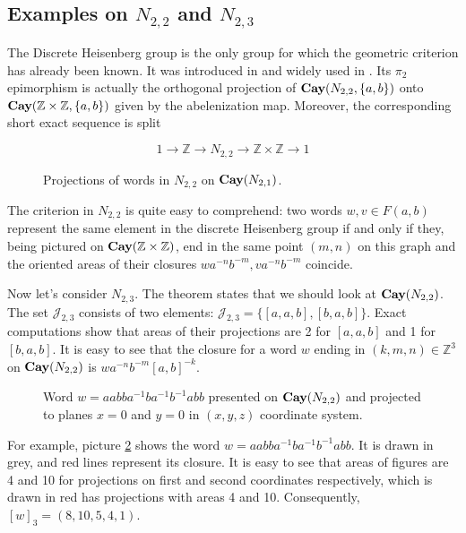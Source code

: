\documentclass[11pt]{amsart}
\theoremstyle{plain}
\theoremstyle{definition}
\numberwithin{equation}{section}
\newcommand{\Cay}{\text{\bf Cay}}
\newcommand{\ZZ}{\mathbb{Z}}
\begin{document}
\subsection{Examples on $N_{2,2}$ and $N_{2,3}$}
The Discrete Heisenberg group is the only group for which the geometric criterion has already been known. It was introduced in \cite{Shapiro} and widely used in \cite{Ruslan, Shapiro, InfiniteG, Rational growth}. Its $\pi_2$ epimorphism is actually the orthogonal projection of $\Cay(N_{2,2},\{a,b\})$ onto $\Cay(\ZZ\times\ZZ,\{a,b\})$ given by the abelenization map. Moreover, the corresponding short exact sequence is split

$$1\longrightarrow \ZZ \longrightarrow N_{2,2}\longrightarrow \ZZ\times\ZZ\longrightarrow1$$



   \begin{figure}[h]
\caption{Projections of words in $N_{2,2}$ on  $\Cay(N_{2,1})$.}
\label{Geodesics}
\end{figure}

The criterion in $N_{2,2}$ is quite easy to comprehend: two words $w,v\in F(a,b)$ represent the same element in the discrete Heisenberg group if and only if they, being pictured on $\Cay(\ZZ\times\ZZ)$, end in the same point $(m,n)$ on this graph and the oriented areas of their closures $wa^{-n}b^{-m}, va^{-n}b^{-m}$ coincide.


Now let's consider $N_{2,3}$. The theorem states that we should look at $\Cay(N_{2,2})$. The set $\mathcal{J}_{2,3}$ consists of two elements: $\mathcal{J}_{2,3} = \{[a,a,b], [b,a,b]\}$. Exact computations show that areas of their projections are 2 for $[a,a,b]$ and 1 for $[b,a,b]$. It is easy to see that the closure for a word $w$ ending in $(k,m,n) \in \ZZ^3$ on $\Cay(N_{2,2})$ is $wa^{-n}b^{-m}[a,b]^{-k}$. 


 \begin{figure}[h]
\caption{Word $w = aabba^{-1}ba^{-1}b^{-1}abb$ presented on $\Cay(N_{2,2})$ and projected to planes $x=0$ and $y=0$ in $(x,y,z)$ coordinate system.}
\label{Wordss}
\end{figure}
For example, picture \ref{Wordss} shows the word $w =aabba^{-1}ba^{-1}b^{-1}abb$. It is drawn in grey, and red lines represent its closure. It is easy to see that areas of figures are 4 and 10 for projections on first and second coordinates respectively, which is drawn in red has projections with areas 4 and 10. Consequently, $[w]_3 = (8,10,5,4,1)$. 
\end{document}
